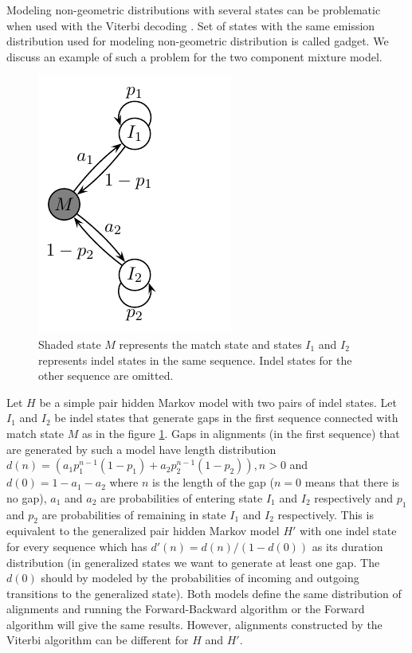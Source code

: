 Modeling non-geometric distributions with several states can be problematic when
used with the Viterbi decoding \cite{Vinar2005}. Set of states with the same
emission distribution used for modeling non-geometric distribution is called
gadget. We discuss an example of such a problem for the two component mixture
model.

\begin{figure}
\begin{center}
\includegraphics{../figures/twoComponentMixtureModel.pdf}
\end{center}
\caption[The example of an HMM modeling two component geometric distribution]{
Shaded state $M$ represents the match state and states $I_1$ and $I_2$
represents indel states in the same sequence. Indel states for the other
sequence are omitted.
}\label{FIGURE:TWOCOMPONENT}
\end{figure}

Let $H$ be a simple pair hidden Markov model with two pairs of indel states.
Let $I_1$ and $I_2$ be indel states that generate gaps in the first sequence
connected with match state $M$ as in the figure \ref{FIGURE:TWOCOMPONENT}.  Gaps
in alignments (in the first sequence) that are generated by such a model have
length distribution $d(n)=(a_1p_1^{n-1}(1-p_1)+a_2p_2^{n-1}(1-p_2)), n>0$ and
$d(0) = 1-a_1 - a_2$ where $n$ is the length of the gap ($n=0$ means that there
is no gap), $a_1$ and $a_2$ are probabilities of entering state $I_1$ and $I_2$
respectively and $p_1$ and $p_2$ are probabilities of remaining in state $I_1$
and $I_2$ respectively.  This is equivalent to the generalized pair hidden
Markov model $H'$ with one indel state for every sequence which has
$d'(n)=d(n)/(1-d(0))$ as its duration distribution (in generalized states we
want to generate at least one gap. The $d(0)$ should by modeled by the
probabilities of incoming and outgoing transitions to the generalized state). Both models define the same
distribution of alignments  and running the Forward-Backward algorithm or the
Forward algorithm will give the same results. However, alignments constructed by
the Viterbi algorithm can be different for $H$ and $H'$.

